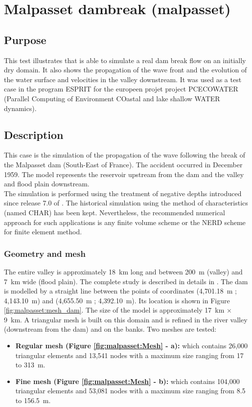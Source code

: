 \chapter{Malpasset dambreak (malpasset)}

\section{Purpose}

This test illustrates that  is able to simulate a real dam break flow
on an initially dry domain. It also shows the propagation of the wave front
and the evolution of the water surface and velocities in the valley downstream.
It was used as a test case in the program ESPRIT for the europeen projet project
PCECOWATER (Parallel Computing of Environment COastal and lake shallow WATER dynamics).

\section{Description}

This case is the simulation of the propagation of the wave following the break
of the Malpasset dam (South-East of France).
The accident occurred in December 1959.
The model represents the reservoir upstream from the dam and the valley and
flood plain downstream. \\

The simulation is performed using the treatment of negative depths introduced
since release 7.0 of .
The historical simulation using the method of characteristics (named CHAR) has
been kept.
Nevertheless, the recommended numerical approach for such applications is any
finite volume scheme or the NERD scheme for finite element method.

\subsection{Geometry and mesh}
The entire valley is approximately 18~km long and between 200~m (valley) and
7~km wide (flood plain).
The complete study is described in details in \cite{Hervouet2007}.
The dam is modelled by a straight line between the points of coordinates
(4,701.18~m ; 4,143.10~m) and (4,655.50~m ; 4,392.10~m).
Its location is shown in Figure \ref{fig:malpasset:mesh_dam}.
The size of the model is approximately  17~km $\times$ 9~km.
A triangular mesh is built on this domain and is refined in the river valley
(downstream from the dam) and on the banks.
Two meshes are tested:
\begin{itemize}
\item \textbf{Regular mesh (Figure \ref{fig:malpasset:Mesh} - a):}
which contains 26,000 triangular elements and 13,541 nodes with a maximum size
ranging from 17 to 313~m.\\
\item \textbf{Fine mesh (Figure \ref{fig:malpasset:Mesh} - b):}
which contains 104,000 triangular elements and 53,081 nodes with a maximum size
ranging from 8.5 to 156.5~m.
\end{itemize}

